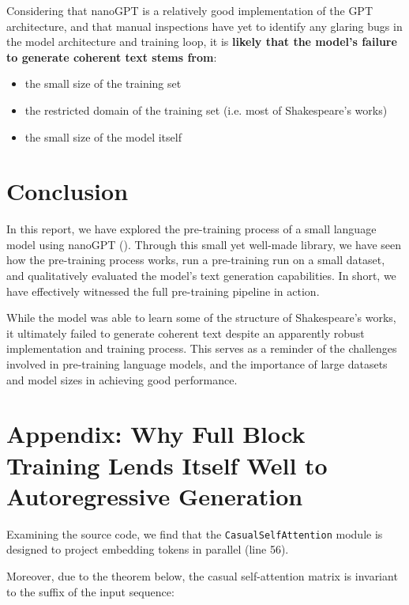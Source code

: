 \documentclass{article} %
\theoremstyle{definition}
\begin{document}
Considering that nanoGPT is a relatively good implementation of the GPT architecture,
and that manual inspections have yet to identify any glaring bugs in the model architecture
and training loop, it is \textbf{likely that the model's failure to generate coherent text
stems from}: 
\begin{itemize}
    \item the small size of the training set
    \item the restricted domain of the training set (i.e. most of Shakespeare's works)
    \item the small size of the model itself
\end{itemize}

\section{Conclusion}
In this report, we have explored the pre-training process of a small language model
using nanoGPT (\cite{nanoGPT}). Through this small yet well-made library, 
we have seen how the pre-training process works,
run a pre-training run on a small dataset,
and qualitatively evaluated the model's text generation capabilities.
In short, we have effectively witnessed the full pre-training pipeline in action.

While the model was able to learn some of the structure of Shakespeare's works,
it ultimately failed to generate coherent text despite an apparently robust implementation
and training process.
This serves as a reminder of the challenges involved in pre-training language models,
and the importance of large datasets and model sizes in achieving good performance.




\appendix

\section{Appendix: Why Full Block Training Lends Itself Well to Autoregressive Generation}
\label{sec:appendix_autoregressive}

Examining the source code, we find that the \texttt{CasualSelfAttention}
module is designed to project embedding tokens in parallel (line 56).

Moreover, due to the theorem below, the casual self-attention matrix 
is invariant to the suffix of the input sequence:
\end{document}
